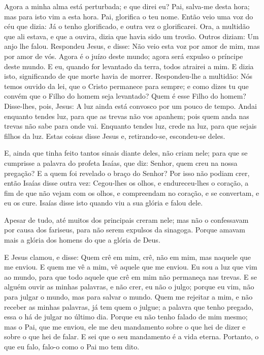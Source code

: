 Agora a minha alma está perturbada; e que direi eu? Pai, salva-me
desta hora; mas para isto vim a esta hora. Pai, glorifica o
teu nome. Então veio uma voz do céu que dizia: Já o tenho
glorificado, e outra vez o glorificarei. Ora, a multidão que
ali estava, e que a ouvira, dizia que havia sido um trovão. Outros
diziam: Um anjo lhe falou. Respondeu Jesus, e disse: Não veio
esta voz por amor de mim, mas por amor de vós. Agora é o
juízo deste mundo; agora será expulso o príncipe deste mundo.
E eu, quando for levantado da terra, todos atrairei a mim.
E dizia isto, significando de que morte havia de morrer.
Respondeu-lhe a multidão: Nós temos ouvido da lei, que o
Cristo permanece para sempre; e como dizes tu que convém que o Filho
do homem seja levantado? Quem é esse Filho do homem?
Disse-lhes, pois, Jesus: A luz ainda está convosco por um
pouco de tempo. Andai enquanto tendes luz, para que as trevas não
vos apanhem; pois quem anda nas trevas não sabe para onde vai.
Enquanto tendes luz, crede na luz, para que sejais filhos da
luz. Estas coisas disse Jesus e, retirando-se, escondeu-se deles.

E, ainda que tinha feito tantos sinais diante deles, não criam
nele; para que se cumprisse a palavra do profeta Isaías, que
diz: Senhor, quem creu na nossa pregação? E a quem foi revelado o
braço do Senhor? Por isso não podiam crer, então Isaías disse
outra vez: Cegou-lhes os olhos, e endureceu-lhes o coração, a
fim de que não vejam com os olhos, e compreendam no coração, e se
convertam, e eu os cure. Isaías disse isto quando viu a sua
glória e falou dele.

Apesar de tudo, até muitos dos principais creram nele; mas não o
confessavam por causa dos fariseus, para não serem expulsos da
sinagoga. Porque amavam mais a glória dos homens do que a
glória de Deus.

E Jesus clamou, e disse: Quem crê em mim, crê, não em mim, mas
naquele que me enviou. E quem me vê a mim, vê aquele que me
enviou. Eu sou a luz que vim ao mundo, para que todo aquele
que crê em mim não permaneça nas trevas. E se alguém ouvir as
minhas palavras, e não crer, eu não o julgo; porque eu vim, não para
julgar o mundo, mas para salvar o mundo. Quem me rejeitar a
mim, e não receber as minhas palavras, já tem quem o julgue; a
palavra que tenho pregado, essa o há de julgar no último dia.
Porque eu não tenho falado de mim mesmo; mas o Pai, que me
enviou, ele me deu mandamento sobre o que hei de dizer e sobre o que
hei de falar. E sei que o seu mandamento é a vida eterna.
Portanto, o que eu falo, falo-o como o Pai mo tem dito.


